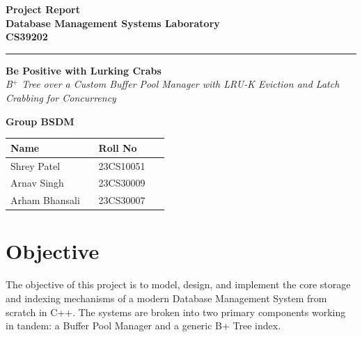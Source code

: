 \documentclass[12pt, a4paper]{article}
\begin{document}
\begin{center}
    {\LARGE \textbf{{Project Report}}}\\[0.4em]
    {\large \textbf{Database Management Systems Laboratory}}\\[0.4em]
    {\large \textbf{CS39202}}\\[1em]
    \vspace{0.4em}
    \hrule
    \vspace{3em}
    {\LARGE \textbf{Be Positive with Lurking Crabs}}\\[0.3em]
    {\large \textit{B$^+$ Tree over a Custom Buffer Pool Manager with LRU-K Eviction and Latch Crabbing for Concurrency}}\\[0.8em]
\end{center}

\vspace{1em}

\begin{center}
    {\normalsize \textbf{{Group BSDM}}}\\[0.4em]
\end{center}

\vspace{0.4em}

\begin{center}
\renewcommand{\arraystretch}{1.5}
\begin{tabular}{p{0.5\linewidth} p{0.4\linewidth}}
\toprule
\textbf{Name} & \textbf{Roll No} \\
\midrule
Shrey Patel & 23CS10051 \\
Arnav Singh & 23CS30009 \\
Arham Bhansali & 23CS30007 \\
\bottomrule
\end{tabular}
\end{center}

\thispagestyle{empty}
\newpage

\tableofcontents
\newpage

\section{Objective}
The objective of this project is to model, design, and implement the core storage and indexing mechanisms of a modern Database Management System from scratch in C++. The systems are broken into two primary components working in tandem: a Buffer Pool Manager and a generic B+ Tree index. 
\end{document}
